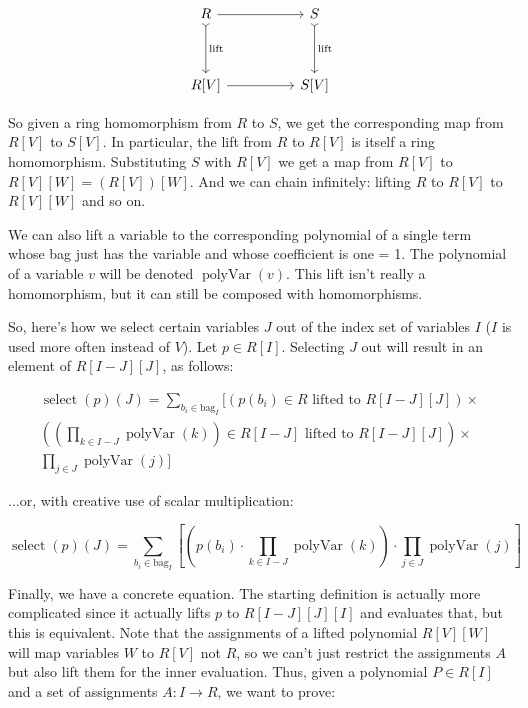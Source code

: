 \documentclass[]{article}
\DeclareMathOperator{\select}{select}
\DeclareMathOperator{\polyVar}{polyVar}
\newcommand{\bag}[1]{\mathrm{bag}_{#1}}
\begin{document}
\[\begin{tikzcd}
	R && S \\
	\\
	{R[V]} && {S[V]}
	\arrow[from=1-1, to=1-3]
	\arrow["{\mathrm{lift}}", tail, from=1-1, to=3-1]
	\arrow["{\mathrm{lift}}", tail, from=1-3, to=3-3]
	\arrow[from=3-1, to=3-3]
\end{tikzcd}\]

So given a ring homomorphism from $R$ to $S$, we get the corresponding map from $R[V]$ to $S[V]$. In particular, the lift from $R$ to $R[V]$ is itself a ring homomorphism. Substituting $S$ with $R[V]$ we get a map from $R[V]$ to $R[V][W] = (R[V])[W]$. And we can chain infinitely: lifting $R$ to $R[V]$ to $R[V][W]$ and so on.

We can also lift a variable to the corresponding polynomial of a single term whose bag just has the variable and whose coefficient is one = 1. The polynomial of a variable $v$ will be denoted $\polyVar(v)$. This lift isn't really a homomorphism, but it can still be composed with homomorphisms.

So, here's how we select certain variables $J$ out of the index set of variables $I$ ($I$ is used more often instead of $V$). Let $p \in R[I]$. Selecting $J$ out will result in an element of $R[I-J][J]$, as follows:

\begin{multline*}
  \select(p)(J) =
  \sum_{b_i \in \bag{I}} \Bigg[(p(b_i) \in R \text{ lifted to } R[I-J][J]) \times \\
                          \left(\left(\prod_{k \in I-J}\polyVar(k)\right) \in R[I-J] \text{ lifted to } R[I-J][J]\right) \times \\
                           \prod_{j \in J}\polyVar(j)\Bigg]
\end{multline*}

...or, with creative use of scalar multiplication:

\[ \select(p)(J) = \sum_{b_i \in \bag{I}} \left[\left(p(b_i) \cdot
                                           \prod_{k \in I-J}\polyVar(k)\right) \cdot
                                           \prod_{j \in J}\polyVar(j)\right] \]

Finally, we have a concrete equation. The starting definition is actually more complicated since it actually lifts $p$ to $R[I-J][J][I]$ and evaluates that, but this is equivalent. Note that the assignments of a lifted polynomial $R[V][W]$ will map variables $W$ to $R[V]$ not $R$, so we can't just restrict the assignments $A$ but also lift them for the inner evaluation. Thus, given a polynomial $P \in R[I]$ and a set of assignments $A: I \to R$, we want to prove:
\end{document}
